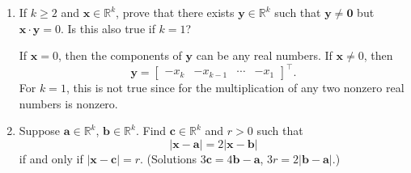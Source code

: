 \begin{enumerate}
\begin{align*}
    \lvert\mathbold{x} - \mathbold{y}\rvert^2
    & = (\mathbold{x} - \mathbold{y}) (\mathbold{x} - \mathbold{y})\\
    & = \lvert\mathbold{x}\rvert^2 - 2\mathbold{x}\cdot\mathbold{y} +
      \lvert\mathbold{y}\rvert^2\eqnumtag\label{ch1prob17b}\\
    \intertext{Then by adding \cref{ch1prob17a,ch1prob17b}, we have}
    \lvert\mathbold{x} + \mathbold{y}\rvert^2 +
    \lvert\mathbold{x} - \mathbold{y}\rvert^2
    & = 2\lvert\mathbold{x}\rvert^2 + 2\lvert\mathbold{y}\rvert^2
  \end{align*}
  Then \(\mathbold{x} + \mathbold{y}\) is the longer diagonal of the
  parallelogram and \(\mathbold{x} - \mathbold{y}\) is the shorter diagonal of
  the parallelogram see \cref{ch1prob17}.
  \begin{figure}[H]
    \centering
    
    \caption{The parallelogram for vectors \(\mathbold{x}\) and
      \(\mathbold{y}\).}
    \label{ch1prob17}
  \end{figure}
  Then the sum of squares of the diagonals of a parallelogram are equal to the
  sum of the squares of the sides of the parallelogram.
\item
  If \(k\geq 2\) and \(\mathbold{x}\in\mathbb{R}^k\), prove that there exists
  \(\mathbold{y}\in\mathbb{R}^k\) such that \(\mathbold{y}\neq\mathbold{0}\)
  but \(\mathbold{x}\cdot\mathbold{y} = 0\).
  Is this also true if \(k = 1\)?
  \par\smallskip
  If \(\mathbold{x} = 0\), then the components of \(\mathbold{y}\) can be any
  real numbers.
  If \(\mathbold{x}\neq 0\), then
  \[
  \mathbold{y} =
  \begin{bmatrix}
    -x_k & -x_{k - 1} & \cdots & -x_1
  \end{bmatrix}^{\intercal}.
  \]
  For \(k = 1\), this is not true since for the multiplication of any two
  nonzero real numbers is nonzero.
\item
  Suppose \(\mathbold{a}\in\mathbb{R}^k\), \(\mathbold{b}\in\mathbb{R}^k\).
  Find \(\mathbold{c}\in\mathbb{R}^k\) and \(r > 0\) such that
  \[
  \lvert\mathbold{x} - \mathbold{a}\rvert = 2\lvert\mathbold{x} - \mathbold{b}\rvert
  \]
  if and only if \(\lvert\mathbold{x} - \mathbold{c}\rvert = r\).
  (Solutions \(3\mathbold{c} = 4\mathbold{b} - \mathbold{a}\),
  \(3r = 2\lvert\mathbold{b} - \mathbold{a}\rvert\).)
\end{enumerate}
